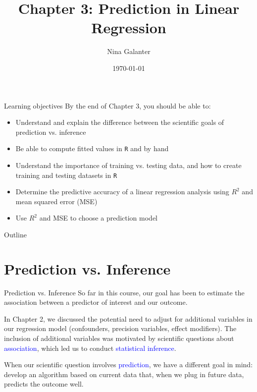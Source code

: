 \documentclass[10pt,t]{beamer}
\title{Chapter 3: Prediction in Linear Regression}
\author{Nina Galanter}
\date{\today}
\begin{document}
	\begin{frame}
	\titlepage 
\end{frame}

\begin{frame}{Learning objectives}
By the end of Chapter 3, you should be able to:

\vspace{0.3cm} 
\begin{itemize}
	\item Understand and explain the difference between the scientific goals of prediction vs. inference
	\medskip
	\item Be able to compute fitted values in \texttt{R} and by hand
		\medskip
	\item Understand the importance of training vs. testing data, and how to create training and testing datasets in \texttt{R}
		\medskip
	\item Determine the predictive accuracy of a linear regression analysis using $R^2$ and mean squared error (MSE)
		\medskip
	\item Use $R^2$ and MSE to choose a prediction model
\end{itemize}
\end{frame}

\begin{frame}{Outline}
\tableofcontents
\end{frame}




\section{Prediction vs. Inference}

\begin{frame}{Prediction vs. Inference}
So far in this course, our goal has been to estimate the association between a predictor of interest and our outcome.

\vspace{0.3cm}

In Chapter 2, we discussed the potential need to adjust for additional variables in our regression model (confounders, precision variables, effect modifiers). The inclusion of additional variables was motivated by scientific questions about  \textcolor{blue}{association}, which led us to conduct  \textcolor{blue}{statistical inference}.

\vspace{0.3cm}

When our scientific question involves  \textcolor{blue}{prediction}, we have a different goal in mind: develop an algorithm based on current data that, when we plug in future data, predicts the outcome well.
\end{frame}
\end{document}
